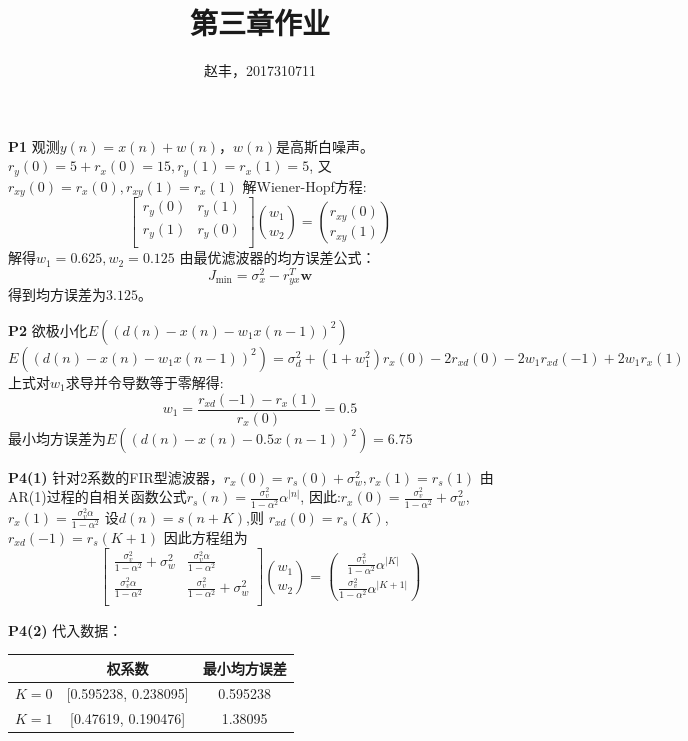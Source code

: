\documentclass{article}
\begin{document}
\title{第三章作业}
\author{赵丰，2017310711}
\maketitle
\textbf{P1}
观测$y(n)=x(n)+w(n)$，$w(n)$是高斯白噪声。
$r_y(0)=5+r_x(0)=15,r_y(1)=r_x(1)=5$,
又$r_{xy}(0)=r_x(0),r_{xy}(1)=r_x(1)$
解Wiener-Hopf方程:
\begin{equation}
\begin{bmatrix}
r_y(0) & r_y(1)\\
r_y(1) & r_y(0)\\
\end{bmatrix}\binom{w_1}{w_2}=
\binom{r_{xy}(0)}{r_{xy}(1)}
\end{equation}
解得$w_1=0.625,w_2=0.125$
由最优滤波器的均方误差公式：
\begin{equation}
J_{\text{min}}=\sigma_x^2-r_{yx}^T \bm{w}
\end{equation}
得到均方误差为$3.125$。

\textbf{P2}
欲极小化$E((d(n)-x(n)-w_1 x(n-1))^2)$
\begin{equation}
E((d(n)-x(n)-w_1 x(n-1))^2)=\sigma_d^2+(1+w_1^2)r_x(0)-2r_{xd}(0)-2w_1r_{xd}(-1)+2w_1r_x(1)
\end{equation}
上式对$w_1$求导并令导数等于零解得:
\begin{equation}
w_1=\frac{r_{xd}(-1)-r_x(1)}{r_x(0)}=0.5
\end{equation}
最小均方误差为$E((d(n)-x(n)-0.5 x(n-1))^2)=6.75$

\textbf{P4(1)}
针对2系数的FIR型滤波器，$r_x(0)=r_s(0)+\sigma_w^2,r_x(1)=r_s(1)$
由AR(1)过程的自相关函数公式$r_s(n)=\frac{\sigma_v^2}{1-\alpha^2}\alpha^{|n|}$,
因此:$r_x(0)=\frac{\sigma_v^2}{1-\alpha^2}+\sigma_w^2$,$r_x(1)=\frac{\sigma_v^2 \alpha}{1-\alpha^2}$
设$d(n)=s(n+K)$,则
$r_{xd}(0)=r_s(K)$,$r_{xd}(-1)=r_s(K+1)$
因此方程组为
\begin{equation}
\begin{bmatrix}
\frac{\sigma_v^2}{1-\alpha^2}+\sigma_w^2 & \frac{\sigma_v^2 \alpha}{1-\alpha^2}\\
\frac{\sigma_v^2 \alpha}{1-\alpha^2} & \frac{\sigma_v^2}{1-\alpha^2}+\sigma_w^2\\
\end{bmatrix}\binom{w_1}{w_2}=
\binom{\frac{\sigma_v^2}{1-\alpha^2}\alpha^{|K|}}{\frac{\sigma_v^2}{1-\alpha^2}\alpha^{|K+1|}}
\end{equation}

\textbf{P4(2)}
代入数据：
\begin{table}[!ht]
\centering
\begin{tabular}{ccc}
\hline
&权系数 & 最小均方误差 \\
\hline
$K=0$ & [0.595238, 0.238095] & 0.595238 \\
$K=1$ & [0.47619, 0.190476] &  1.38095 \\
\hline
\end{tabular}
\end{table}
\end{document}
